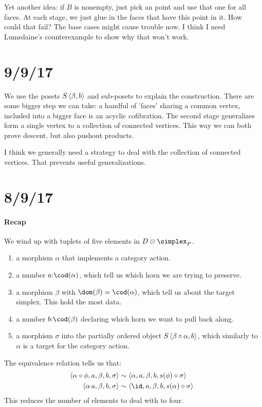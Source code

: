 \documentclass[csh.tex]{subfiles}
\begin{document}
Yet another idea: if $B$ is nonempty, just pick an point and use that one for all faces. At each stage, we just glue in the faces that have this point in it. How could that fail? The base cases might cause trouble now. I think I need Lumsdaine's counterexample to show why that won't work.

\section{9/9/17}
We use the posets $S\left\langle \beta,b \right\rangle$ and sub-posets to explain the construction. There are some bigger step we can take: a handful of 'faces' sharing a common vertex, included into a bigger face is an acyclic cofibration. The second stage generalizes form a single vertex to a collection of connected vertices. This way we can both prove descent, but also pushout products.

I think we generally need a strategy to deal with the collection of connected vertices. That prevents useful generalizations.

\section{8/9/17}

\paragraph{Recap}
We wind up with tuplets of five elements in $D\otimes \simplex_P$.
\begin{enumerate}
\item a morphism $\alpha$ that implements a category action.
\item a number $a\of\cod(\alpha)$, which tell us which horn we are trying to preserve.
\item a morphism $\beta$ with $\dom(\beta) = \cod(\alpha)$, which tell us about the target simplex. This hold the most data.
\item a number $b\of \cod(\beta)$ declaring which horn we want to pull back along.
\item a morphism $\sigma$ into the partially ordered object $S\left\langle \beta\circ \alpha,b \right\rangle$, which similarly to $\alpha$ is a target for the category action.
\end{enumerate}
The equivalence relation tells us that:
\begin{align*}
\tuplet{\alpha\circ\phi,a,\beta,b,\sigma}&\sim
\tuplet{\alpha,a,\beta,b,s(\phi)\circ\sigma}\\
\tuplet{\alpha\,a,\beta,b,\sigma}&\sim
\tuplet{\id,a,\beta,b,s(\alpha)\circ\sigma}\\
\end{align*}
This reduces the number of elements to deal with to four.
\end{document}
